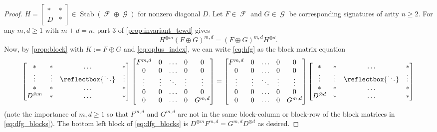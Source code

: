 \documentclass{article}
\providecommand{\iddots}{\mathinner{\reflectbox{\ensuremath{\ddots}}}}
\DeclareMathOperator{\fc}{\mathcal{F}}
\DeclareMathOperator{\gc}{\mathcal{G}}
\DeclareMathOperator{\stab}{Stab}
\begin{document}
\begin{proof}
    $H = \begin{bmatrix} * & * \\ D & * \end{bmatrix} \in \stab(\fc \oplus \gc)$ for nonzero diagonal
    $D$. 
    Let $F \in \fc$ and $G \in \gc$ be corresponding signatures of arity $n \geq 2$. 
    For any $m,d \geq 1$ with $m+d = n$, part 3 of \autoref{prop:invariant_tcwd} gives
    \begin{equation}
        \label{eq:hfg}
        H^{\otimes m}(F \oplus G)^{m,d} = (F \oplus G)^{m,d}H^{\otimes d}.
    \end{equation}
    Now, by \autoref{prop:block} with $K := F \oplus G$ and \eqref{eq:oplus_index},
    we can write \eqref{eq:hfg} as the block matrix equation
    \begin{equation}
        \begin{bmatrix} 
            * & * & \ldots & *\\
            \vdots & \vdots & \iddots & \vdots\\
            * & * & \ldots & *\\
            D^{\otimes m} & * & \ldots & *
        \end{bmatrix}
        \begin{bmatrix} 
            F^{m,d} & 0 & \ldots & 0 & 0\\
            0 & 0 &\ldots & 0 & 0\\
            \vdots & \vdots & \ddots & \vdots & \vdots\\
            0 & 0 &\ldots & 0 & 0\\
            0 & 0 & \ldots & 0 & G^{m,d}
        \end{bmatrix}
        =
         \begin{bmatrix} 
            F^{m,d} & 0 & \ldots & 0 & 0\\
            0 & 0 &\ldots & 0 & 0\\
            \vdots & \vdots & \ddots & \vdots & \vdots\\
            0 & 0 &\ldots & 0 & 0\\
            0 & 0 & \ldots & 0 & G^{m,d}
        \end{bmatrix}           
        \begin{bmatrix} 
            * & * & \ldots & * \\
            \vdots & \vdots & \iddots & \vdots \\
            * & * & \ldots & *\\
            D^{\otimes d} & * & \ldots & *
        \end{bmatrix}
        \label{eq:dfg_blocks}
    \end{equation}
    (note the importance of $m,d \geq 1$ so that $F^{m,d}$ and $G^{m,d}$ are not in the same
    block-column or block-row of the block matrices in \eqref{eq:dfg_blocks}).
    The bottom left block of \eqref{eq:dfg_blocks} is
    $D^{\otimes m} F^{m,d} = G^{m,d} D^{\otimes d}$ as desired.
\end{proof}
\end{document}
